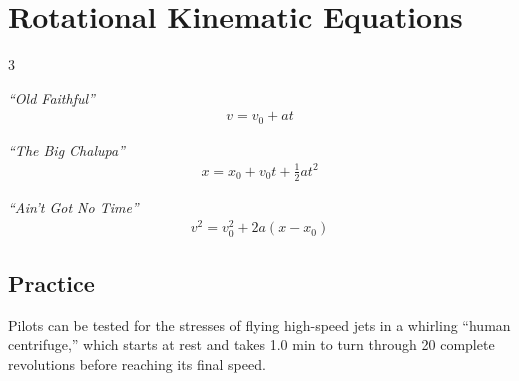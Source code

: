 \documentclass[10pt]{exam}
\begin{document}
\section*{Rotational Kinematic Equations}

\begin{multicols}{3}
  \begin{center}
      \emph{``Old Faithful''} 
      \begin{align*}
        v = v_0 + a t
      \end{align*}

      \columnbreak
      
      \emph{``The Big Chalupa''} 
      \begin{align*}
        x = x_0 + v_0t + \frac{1}{2}at^2
      \end{align*}

      \columnbreak
      
      \emph{``Ain't Got No Time''}
      \begin{align*}
        v^2 = v_0^2 + 2a \left( x - x_0 \right)
      \end{align*}

  \end{center}
\end{multicols}

\vspace{5em}

\subsection*{Practice}

Pilots can be tested for the stresses of flying high-speed jets in a whirling ``human centrifuge,'' which starts at rest and takes 1.0 min to turn through 20 complete revolutions before reaching its final speed.

\vspace{2em}

\end{document}
